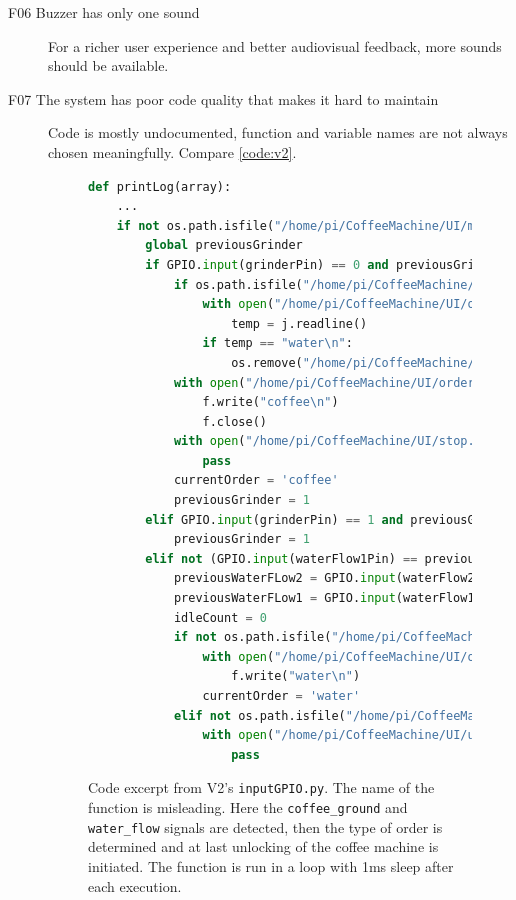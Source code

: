 \documentclass[12pt]{article}
\begin{document}
\begin{description}
\item [F06 Buzzer has only one sound]
\label{pa:F06}
For a richer user experience and better audiovisual feedback, more sounds should be available.

\item [F07 The system has poor code quality that makes it hard to maintain]\hspace*{\fill}
\label{pa:F07}
Code is mostly undocumented, function and variable names are not always chosen meaningfully.
Compare \autoref{code:v2}.

\begin{figure}[H]
\centering
\begin{lstlisting}[language=Python, basicstyle=\footnotesize, frame=single]
def printLog(array):
    ...
    if not os.path.isfile("/home/pi/CoffeeMachine/UI/maintenance.txt"):
        global previousGrinder
        if GPIO.input(grinderPin) == 0 and previousGrinder == 1 and not currentOrder == 'coffee':
            if os.path.isfile("/home/pi/CoffeeMachine/UI/order.txt") :
                with open("/home/pi/CoffeeMachine/UI/order.txt", "r") as j:
                    temp = j.readline()
                if temp == "water\n":
                    os.remove("/home/pi/CoffeeMachine/UI/order.txt")
            with open("/home/pi/CoffeeMachine/UI/order.txt", "a+") as f:
                f.write("coffee\n")
                f.close()
            with open("/home/pi/CoffeeMachine/UI/stop.txt", "a") as f:
                pass
            currentOrder = 'coffee'
            previousGrinder = 1
        elif GPIO.input(grinderPin) == 1 and previousGrinder == 0:
            previousGrinder = 1
        elif not (GPIO.input(waterFlow1Pin) == previousWaterFLow1) or not (GPIO.input(waterFlow2Pin) == previousWaterFLow2):
            previousWaterFLow2 = GPIO.input(waterFlow2Pin)
            previousWaterFLow1 = GPIO.input(waterFlow1Pin)
            idleCount = 0
            if not os.path.isfile("/home/pi/CoffeeMachine/UI/order.txt"):
                with open("/home/pi/CoffeeMachine/UI/order.txt", "a+") as f:
                    f.write("water\n")
                currentOrder = 'water'
            elif not os.path.isfile("/home/pi/CoffeeMachine/UI/unlock.txt") and os.path.isfile("/home/pi/CoffeeMachine/UI/order.txt") and currentOrder == 'water':
                with open("/home/pi/CoffeeMachine/UI/unlock.txt", "a") as f:
                    pass
\end{lstlisting}
\caption[Code excerpt from V2's \texttt{inputGPIO.py}.]
{Code excerpt from V2's \texttt{inputGPIO.py}. The name of the function is misleading.
  Here the \texttt{coffee\_ground} and \texttt{water\_flow} signals are detected,
  then the type of order is determined and at last unlocking of the coffee machine is initiated.
  The function is run in a loop with 1ms sleep after each execution.}
\label{code:v2}
\end{figure}

\end{description}
\end{document}
